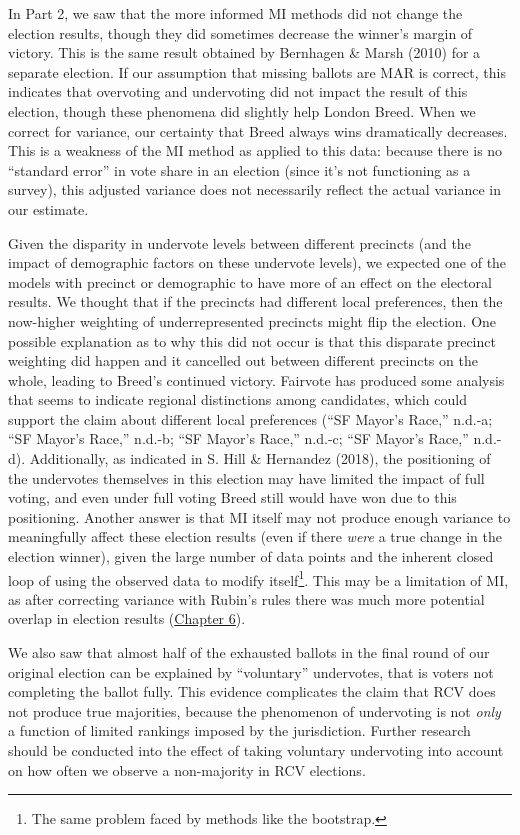 \documentclass[12pt,twoside]{reedthesis}
\begin{document}
In Part 2, we saw that the more informed MI methods did not change the election results, though they did sometimes decrease the winner's margin of victory. This is the same result obtained by Bernhagen \& Marsh (2010) for a separate election. If our assumption that missing ballots are MAR is correct, this indicates that overvoting and undervoting did not impact the result of this election, though these phenomena did slightly help London Breed. When we correct for variance, our certainty that Breed always wins dramatically decreases. This is a weakness of the MI method as applied to this data: because there is no ``standard error'' in vote share in an election (since it's not functioning as a survey), this adjusted variance does not necessarily reflect the actual variance in our estimate.

Given the disparity in undervote levels between different precincts (and the impact of demographic factors on these undervote levels), we expected one of the models with precinct or demographic to have more of an effect on the electoral results. We thought that if the precincts had different local preferences, then the now-higher weighting of underrepresented precincts might flip the election. One possible explanation as to why this did not occur is that this disparate precinct weighting did happen and it cancelled out between different precincts on the whole, leading to Breed's continued victory. Fairvote has produced some analysis that seems to indicate regional distinctions among candidates, which could support the claim about different local preferences (``SF Mayor's Race,'' n.d.-a; ``SF Mayor's Race,'' n.d.-b; ``SF Mayor's Race,'' n.d.-c; ``SF Mayor's Race,'' n.d.-d). Additionally, as indicated in S. Hill \& Hernandez (2018), the positioning of the undervotes themselves in this election may have limited the impact of full voting, and even under full voting Breed still would have won due to this positioning. Another answer is that MI itself may not produce enough variance to meaningfully affect these election results (even if there \emph{were} a true change in the election winner), given the large number of data points and the inherent closed loop of using the observed data to modify itself\footnote{The same problem faced by methods like the bootstrap.}. This may be a limitation of MI, as after correcting variance with Rubin's rules there was much more potential overlap in election results (\protect\hyperlink{missing-results}{Chapter 6}).

We also saw that almost half of the exhausted ballots in the final round of our original election can be explained by ``voluntary'' undervotes, that is voters not completing the ballot fully. This evidence complicates the claim that RCV does not produce true majorities, because the phenomenon of undervoting is not \emph{only} a function of limited rankings imposed by the jurisdiction. Further research should be conducted into the effect of taking voluntary undervoting into account on how often we observe a non-majority in RCV elections.
\end{document}
